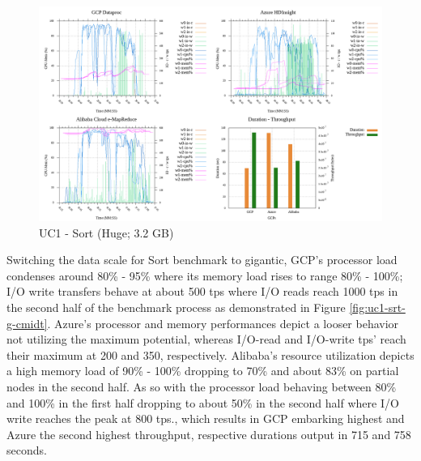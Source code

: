 \documentclass[review]{elsarticle}
\begin{document}
\begin{figure}[p]
	\caption{UC1 - Sort (Huge; 3.2 GB)}
	\label{fig:uc1-srt-h-cmidt}
	\includegraphics[width=\textwidth]{uc1-srt-h-cmidt}
	\centering
\end{figure}


Switching the data scale for Sort benchmark to gigantic, GCP's processor load condenses around 80\% - 95\% where its memory load rises to range 80\% - 100\%; I/O write transfers behave at about 500 tps where I/O reads reach 1000 tps in the second half of the benchmark process as demonstrated in Figure \ref{fig:uc1-srt-g-cmidt}. Azure's processor and memory performances depict a looser behavior not utilizing the maximum potential, whereas I/O-read and I/O-write tps' reach their maximum at 200 and 350, respectively. Alibaba's resource utilization depicts a high memory load of 90\% - 100\% dropping to 70\% and about 83\% on partial nodes in the second half. As so with the processor load behaving between 80\% and 100\% in the first half dropping to about 50\% in the second half where I/O write reaches the peak at 800 tps., which results in GCP embarking highest and Azure the second highest throughput, respective durations output in 715 and 758 seconds.
\end{document}
